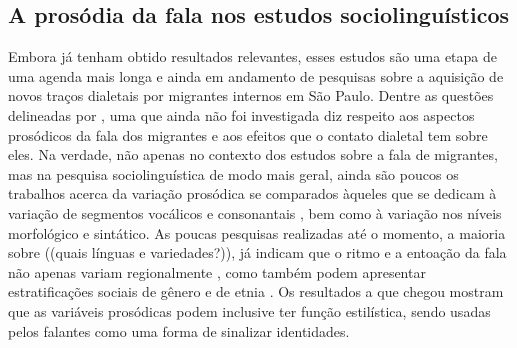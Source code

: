 \documentclass[
		a4paper,	%
		12pt,		%
		]{article}	%
\begin{document}

	\subsection{A prosódia da fala nos estudos sociolinguísticos}
	\label{prosodia-socio}

	Embora já tenham obtido resultados relevantes, esses estudos são uma etapa
	de uma agenda mais longa e ainda em andamento de pesquisas sobre a aquisição
	de novos traços dialetais por migrantes internos em São Paulo. Dentre as
	questões delineadas por \citet{Oushiro2018}, uma que ainda não foi
	investigada diz respeito aos aspectos prosódicos da fala dos migrantes e aos
	efeitos que o contato dialetal tem sobre eles. Na verdade, não apenas no
	contexto dos estudos sobre a fala de migrantes, mas na pesquisa
	sociolinguística de modo mais geral, ainda são poucos os trabalhos acerca da
	variação prosódica se comparados àqueles que se dedicam à variação de
	segmentos vocálicos e consonantais \citep{Thomas2013, Hay.Drager2007}, bem como à variação nos níveis morfológico e sintático. As poucas pesquisas realizadas até o momento, a maioria sobre ((quais línguas e variedades?)), já indicam que o ritmo e
	a entoação da fala não apenas variam regionalmente
	\citep{Clopper.Smiljanic2015, Grabe.etal2000}, como também podem apresentar
	estratificações sociais de gênero \citep{Lowry2011} e de etnia
	\citep{Thomas2013, Szakay2006}.  Os resultados a que \citet{Podesva2011}
	chegou mostram que as variáveis prosódicas podem inclusive ter função
	estilística, sendo usadas pelos falantes como uma forma de sinalizar identidades.
	
	
\end{document}
